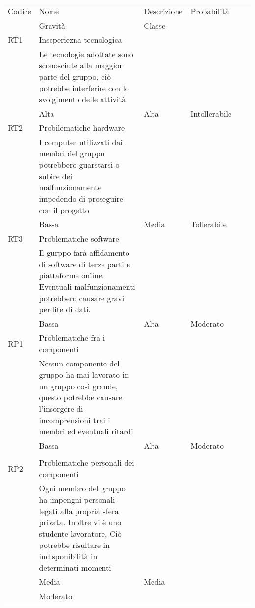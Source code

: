 \begin{table}
	\centering
	\begin{tabular}{p{}p{}p{}p{}p{}p{}} \toprule
		Codice & Nome  & Descrizione  & Probabilità\\ & Gravità & Classe         \\
		RT1    & Inseperiezna tecnologica\\                   & Le tecnologie adottate sono sconosciute alla maggior parte del gruppo, ciò potrebbe interferire con lo svolgimento delle attività\\                                                                                                                             & Alta          & Alta    & Intollerabile  \\
		RT2    & Probilematiche hardware\\                    & I computer utilizzati dai membri del gruppo potrebbero guarstarsi o subire dei malfunzionamente impedendo di proseguire con il progetto\\                                                                                                                       & Bassa         & Media   & Tollerabile    \\
		RT3    & Problematiche software\\                     & Il gurppo farà affidamento di software di terze parti e piattaforme online. Eventuali malfunzionamenti potrebbero causare gravi perdite di dati.\\                                                                                                              & Bassa         & Alta    & Moderato       \\
		RP1    & Problematiche fra i~ componenti\\            & Nessun componente del gruppo ha mai lavorato in un gruppo così grande, questo potrebbe causare l'insorgere di incomprensioni trai i membri ed eventuali ritardi\\                                                                                               & Bassa         & Alta    & Moderato\\     \\
		RP2    & Problematiche personali dei componenti\\     & Ogni membro del gruppo ha impengni personali legati alla propria sfera privata. Inoltre vi è uno studente lavoratore. Ciò potrebbe risultare in indisponibilità in determinati momenti\\                                                                        & Media         & Media\\ & Moderato       \\

\end{tabular}
\end{table}
